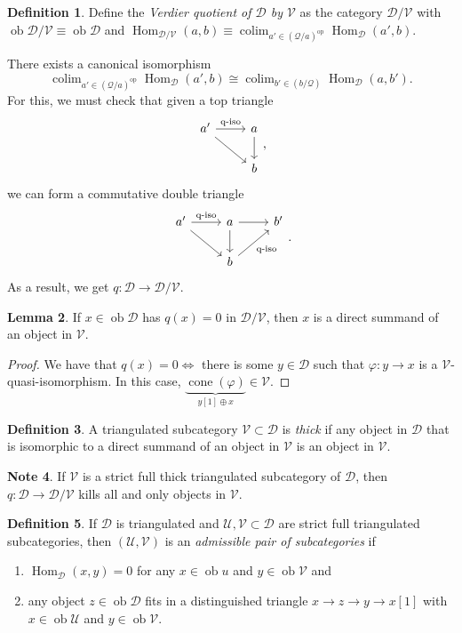 \documentclass[10pt,letterpaper,cm]{nupset}
\theoremstyle{definition}
\newtheorem{definition}{Definition}[subsection]
\newtheorem{note}[definition]{Note}
\theoremstyle{theorem}
\newtheorem{lemma}[definition]{Lemma}
\theoremstyle{remark}
\newcommand{\1}{\mathbf{1}}
\renewcommand{\d}{\mathscr{D}}
\newcommand{\q}{\mathscr{Q}}
\renewcommand{\u}{\mathscr{U}}
\renewcommand{\v}{\mathscr{V}}
\newcommand{\0}{\vec 0}
\DeclareMathOperator{\op}{op}
\DeclareMathOperator{\ob}{ob}
\DeclareMathOperator{\Hom}{Hom}
\DeclareMathOperator{\cone}{cone}
\DeclareMathOperator{\colim}{colim}
\begin{document}
\begin{definition}
Define the \textit{Verdier quotient of $\d$ by $\v$} as the category $\d/\v$ with $\ob{\d/\v} \equiv \ob{\d}$ and $\Hom_{\d/\v}(a,b) \equiv \colim_{a' \in (\q/a)^{\op}} \Hom_{\d}(a',b)$.
\end{definition}


There exists a canonical isomorphism $$\colim_{a' \in (\q/a)^{\op}} \Hom_{\d}(a', b) \cong \colim_{b' \in (b/\q)}\Hom_{\d}(a, b').$$  For this, we must check that given a top triangle 
\[
\begin{tikzcd}
a' \arrow[r, "\text{q-iso}"] \arrow[rd] & a \arrow[d] \\
                                        & b          
\end{tikzcd},
\] we can form a commutative double triangle  
\[
\begin{tikzcd}
a' \arrow[r, "\text{q-iso}"] \arrow[rd] & a \arrow[d] \arrow[r]         & b' \\
                                        & b \arrow[ru, "\text{q-iso}"'] &   
\end{tikzcd}
.\]
As a result, we get $q: \d \to \d/\v$.

\smallskip

\begin{lemma}
If $x \in \ob{\d}$ has $q(x) = 0$ in $\d/\v$, then $x$ is a direct summand of an object in $\v$.
\end{lemma}
\begin{proof}
We have that $q(x) =0 \iff$ there is some $y\in \d$ such that $\varphi : y \to x$ is a $\v$-quasi-isomorphism. In this case, $\underbrace{\cone(\varphi)}_{y[1] \oplus x} \in \v$.
\end{proof}

\begin{definition}
A triangulated subcategory $\v \subset \d$ is \textit{thick} if any object in $\d$ that is isomorphic to a direct summand of an object in $\v$ is an object in $\v$. 
\end{definition}

\begin{note}
If $\v$ is a strict full thick triangulated subcategory	 of $\d$, then $q : \d \to \d/\v$ kills all and only objects in $\v$. 
\end{note}

\begin{definition}
If $\d$ is triangulated and $\u, \v \subset \d$ are strict full triangulated subcategories, then $\left(\u, \v\right)$ is an \textit{admissible pair of subcategories} if 
\begin{enumerate}[label=(\alph*)]
\item $\Hom_{\d}(x,y) =0$ for any $x \in \ob{u}$ and $y \in \ob{\v}$ and
\item any object $z \in \ob{\d}$ fits in a distinguished triangle $x \to z \to y \to x[1]$ with $x \in \ob{\u}$ and $y \in \ob{\v}$. 
\end{enumerate}
\end{definition}
\end{document}
